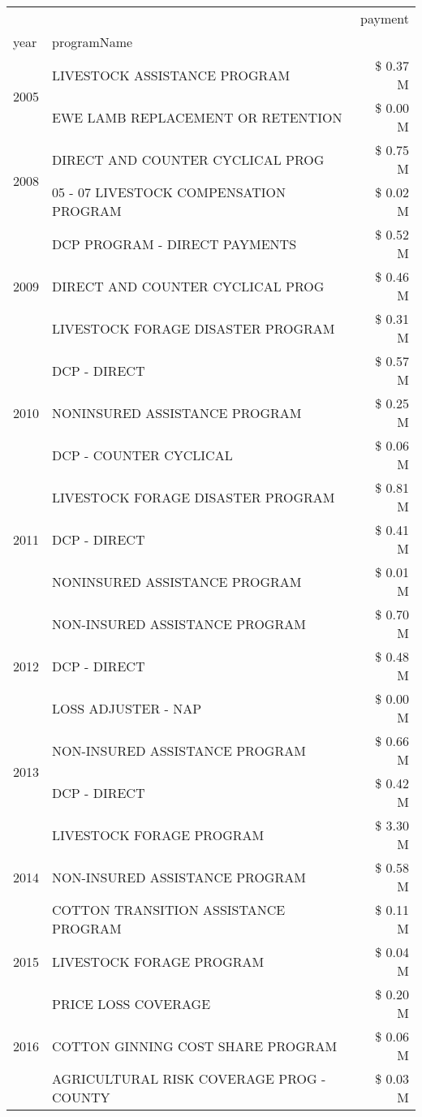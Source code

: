 \begin{tabular}{llr}
\toprule
 &  & payment \\
year & programName &  \\
\midrule
\multirow[t]{2}{*}{2005} & LIVESTOCK ASSISTANCE PROGRAM & \$ 0.37 M \\
 & EWE LAMB REPLACEMENT OR RETENTION & \$ 0.00 M \\
\cline{1-3}
\multirow[t]{2}{*}{2008} & DIRECT AND COUNTER CYCLICAL PROG & \$ 0.75 M \\
 & 05 - 07 LIVESTOCK COMPENSATION PROGRAM & \$ 0.02 M \\
\cline{1-3}
\multirow[t]{3}{*}{2009} & DCP PROGRAM - DIRECT PAYMENTS & \$ 0.52 M \\
 & DIRECT AND COUNTER CYCLICAL PROG & \$ 0.46 M \\
 & LIVESTOCK FORAGE DISASTER  PROGRAM & \$ 0.31 M \\
\cline{1-3}
\multirow[t]{3}{*}{2010} & DCP - DIRECT & \$ 0.57 M \\
 & NONINSURED ASSISTANCE PROGRAM & \$ 0.25 M \\
 & DCP - COUNTER CYCLICAL & \$ 0.06 M \\
\cline{1-3}
\multirow[t]{3}{*}{2011} & LIVESTOCK FORAGE DISASTER PROGRAM & \$ 0.81 M \\
 & DCP - DIRECT & \$ 0.41 M \\
 & NONINSURED ASSISTANCE PROGRAM & \$ 0.01 M \\
\cline{1-3}
\multirow[t]{3}{*}{2012} & NON-INSURED ASSISTANCE PROGRAM & \$ 0.70 M \\
 & DCP - DIRECT & \$ 0.48 M \\
 & LOSS ADJUSTER - NAP & \$ 0.00 M \\
\cline{1-3}
\multirow[t]{2}{*}{2013} & NON-INSURED ASSISTANCE PROGRAM & \$ 0.66 M \\
 & DCP - DIRECT & \$ 0.42 M \\
\cline{1-3}
\multirow[t]{3}{*}{2014} & LIVESTOCK FORAGE PROGRAM & \$ 3.30 M \\
 & NON-INSURED ASSISTANCE PROGRAM & \$ 0.58 M \\
 & COTTON TRANSITION ASSISTANCE PROGRAM & \$ 0.11 M \\
\cline{1-3}
2015 & LIVESTOCK FORAGE PROGRAM & \$ 0.04 M \\
\cline{1-3}
\multirow[t]{3}{*}{2016} & PRICE LOSS COVERAGE & \$ 0.20 M \\
 & COTTON GINNING COST SHARE PROGRAM & \$ 0.06 M \\
 & AGRICULTURAL RISK COVERAGE PROG - COUNTY & \$ 0.03 M \\

\end{tabular}
